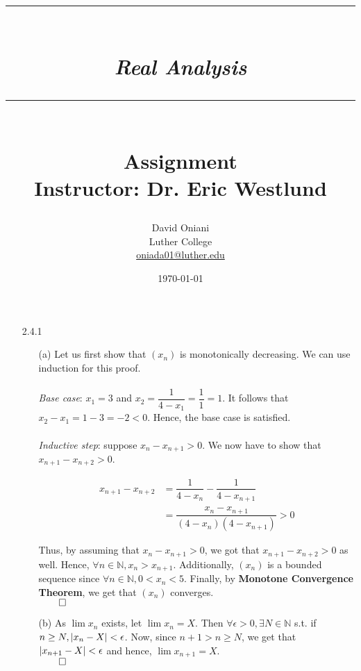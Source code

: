 \documentclass[11pt]{article}
\author{David Oniani\\
        Luther College\\
        \href{mailto:oniada01@luther.edu}{oniada01@luther.edu}}
\title{\rule{\paperwidth - 150pt}{1pt}\textbf{\\\textit{Real Analysis}\\}\rule
{\paperwidth - 150pt}{1pt}\\\textbf{Assignment \textnumero3}\\{\normalsize
Instructor: Dr. Eric Westlund}}
\date{\today}
\DeclarePairedDelimiter\abs{\lvert}{\rvert}%
\newcommand{\nats}{\mathbb{N}}
\begin{document}
\maketitle

%
%
%

\begin{itemize}
    \item[2.4.1]
        \begin{itemize}
            \item[(a)]
                Let us first show that $(x_n)$ is monotonically decreasing. We
                can use induction for this proof.
                \\\\
                \textit{Base case}: $x_1 = 3$ and $x_2 = \dfrac{1}{4 - x_1} =
                \dfrac{1}{1} = 1$.  It follows that $x_2 - x_1 = 1 - 3 = -2 <
                0$. Hence, the base case is satisfied.
                \\\\
                \textit{Inductive step}: suppose $x_n - x_{n + 1} > 0$.
                We now have to show that $x_{n + 1} - x_{n + 2} > 0$.

                \begin{align*}
                    x_{n + 1} - x_{n + 2} & = \dfrac{1}{4 - x_n} -
                        \dfrac{1}{4 - x_{n + 1}}\\
                                          & = \dfrac{x_n -x_{n + 1}}{(4 -
                                              x_n)(4 - x_{n + 1})} > 0
                \end{align*}

                Thus, by assuming that $x_n - x_{n + 1} > 0$, we got that $x_{n
                + 1} - x_{n + 2} > 0$ as well. Hence, $\forall n \in \nats, x_n
                > x_{n + 1}$. Additionally, $(x_n)$ is a bounded sequence since
                $\forall n \in \nats, 0 < x_n < 5$. Finally, by
                \textbf{Monotone Convergence Theorem}, we get that $(x_n)$
                converges.\\
                $\qed$

            \item[(b)]
                As $\lim{x_n}$ exists, let $\lim{x_n} = X$. Then $\forall
                \epsilon > 0, \exists N \in \nats$ s.t. if $n \geq N, \abs{x_n
                - X} < \epsilon$. Now, since $n + 1 > n \geq N$, we get that
                $\abs{x_{n + 1} - X} < \epsilon$ and hence, $\lim{x_{n + 1}} =
                X$.\\
                $\qed$


\end{itemize}
\end{itemize}
\end{document}
